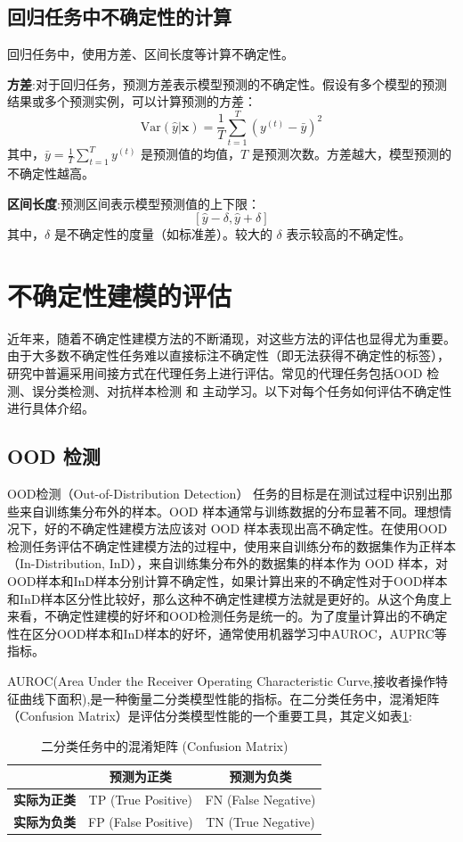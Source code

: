 \subsection{回归任务中不确定性的计算}
回归任务中，使用方差\cite{kendall2017uncertainties}、区间长度\cite{pearce2018high}等计算不确定性。

\textbf{方差}:对于回归任务，预测方差表示模型预测的不确定性。假设有多个模型的预测结果或多个预测实例，可以计算预测的方差：
\[
\text{Var}(\hat{y} | \mathbf{x}) = \frac{1}{T} \sum_{t=1}^{T} \left( y^{(t)} - \bar{y} \right)^2
\]
其中，\( \bar{y} = \frac{1}{T} \sum_{t=1}^{T} y^{(t)} \) 是预测值的均值，\( T \) 是预测次数。方差越大，模型预测的不确定性越高。

\textbf{区间长度}:预测区间表示模型预测值的上下限：
\[
[\hat{y} - \delta, \hat{y} + \delta]
\]
其中，\( \delta \) 是不确定性的度量（如标准差）。较大的 \( \delta \) 表示较高的不确定性。



\section{不确定性建模的评估}
近年来，随着不确定性建模方法的不断涌现，对这些方法的评估也显得尤为重要。由于大多数不确定性任务难以直接标注不确定性（即无法获得不确定性的标签），研究中普遍采用间接方式在代理任务上进行评估。常见的代理任务包括OOD 检测、误分类检测、对抗样本检测 和 主动学习。以下对每个任务如何评估不确定性进行具体介绍。

\subsection{OOD 检测}

OOD检测（Out-of-Distribution Detection） 任务的目标是在测试过程中识别出那些来自训练集分布外的样本。OOD 样本通常与训练数据的分布显著不同。理想情况下，好的不确定性建模方法应该对 OOD 样本表现出高不确定性。在使用OOD检测任务评估不确定性建模方法的过程中，使用来自训练分布的数据集作为正样本（In-Distribution, InD），来自训练集分布外的数据集的样本作为 OOD 样本，对OOD样本和InD样本分别计算不确定性，如果计算出来的不确定性对于OOD样本和InD样本区分性比较好，那么这种不确定性建模方法就是更好的。从这个角度上来看，不确定性建模的好坏和OOD检测任务是统一的。为了度量计算出的不确定性在区分OOD样本和InD样本的好坏，通常使用机器学习中AUROC，AUPRC等指标。

AUROC(Area Under the Receiver Operating Characteristic Curve,接收者操作特征曲线下面积),是一种衡量二分类模型性能的指标。在二分类任务中，混淆矩阵（Confusion Matrix）是评估分类模型性能的一个重要工具，其定义如表\ref{confusion}:
\begin{table}[H]
\centering
\begin{tabular}{|c|c|c|}
\hline
 & \textbf{预测为正类}  & \textbf{预测为负类}  \\
\hline
\textbf{实际为正类}  & TP (True Positive) & FN (False Negative) \\
\hline
\textbf{实际为负类} & FP (False Positive) & TN (True Negative) \\
\hline
\end{tabular}
\caption{二分类任务中的混淆矩阵 (Confusion Matrix)}
\label{confusion}
\end{table}

